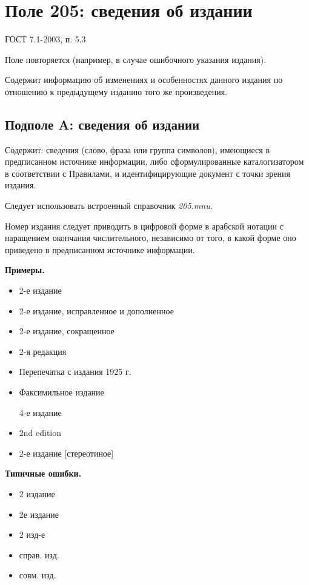 \chapter{Поле 205: сведения об издании}

ГОСТ 7.1-2003, п. 5.3 %

Поле повторяется (например, в случае ошибочного указания издания).

Содержит информацию об изменениях и особенностях данного издания по отношению к предыдущему изданию того же произведения.

\section{Подполе A: сведения об издании}

Содержит: сведения (слово, фраза или группа символов), имеющиеся в предписанном источнике информации, либо сформулированные каталогизатором в соответствии с Правилами, и идентифицирующие документ с точки зрения издания.

Следует использовать встроенный справочник \emph{205.mnu}.

Номер издания следует приводить в цифровой форме в арабской нотации с наращением окончания числительного, независимо от того, в какой форме оно приведено в предписанном источнике информации.

\textbf{Примеры.}

\begin{itemize}
    \item 2-е издание
    \item 2-е издание, исправленное и дополненное
    \item 2-е издание, сокращенное
    \item 2-я редакция
    \item Перепечатка с издания 1925 г.
    \item Факсимильное издание
    \item [4-е издание]
    \item 2nd edition
    \item 2-е издание [стереотиное]
\end{itemize}

\textbf{Типичные ошибки.}

\begin{itemize}
    \item 2 издание
    \item 2е издание
    \item 2 изд-е
    \item справ. изд.
    \item совм. изд.
\end{itemize}

